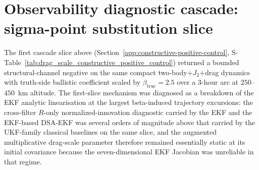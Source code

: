 \documentclass{article}
\begin{document}
\clearpage
\section{Observability diagnostic cascade: sigma-point substitution slice}
\label{app:constructive-positive-control-ukf}

The first cascade slice above (Section~\ref{app:constructive-positive-control}, S-Table~\ref{tab:drag_scale_constructive_positive_control}) returned a bounded structural-channel negative on the same compact two-body+$J_2$+drag dynamics with truth-side ballistic coefficient scaled by $\beta_{\mathrm{true}}=2.5$ over a 3-hour arc at $250$--$450$~km altitude. The first-slice mechanism was diagnosed as a breakdown of the EKF analytic linearisation at the largest beta-induced trajectory excursions: the cross-filter $R$-only normalized-innovation diagnostic carried by the EKF and the EKF-based DSA-EKF was several orders of magnitude above that carried by the UKF-family classical baselines on the same slice, and the augmented multiplicative drag-scale parameter therefore remained essentially static at its initial covariance because the seven-dimensional EKF Jacobian was unreliable in that regime.
\end{document}
